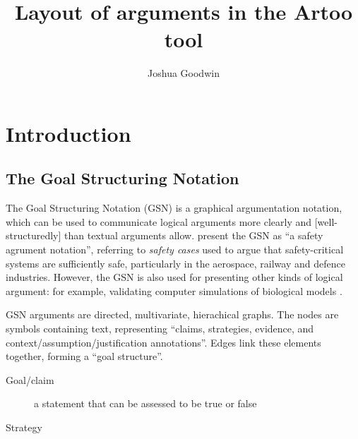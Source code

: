 \documentclass[authoryearcitations]{UoYCSproject}
\author{Joshua Goodwin}
\title{Layout of arguments in the Artoo tool}
\begin{document}
\maketitle





\chapter{Introduction}

\section{The Goal Structuring Notation}

The Goal Structuring Notation (GSN) is a graphical argumentation notation,
which can be used to communicate logical arguments more clearly and [well-structuredly] than textual arguments allow.
\citet{kelly2004goal} present the GSN as ``a safety agrument notation'',
referring to \emph{safety cases} used to argue that safety-critical systems are sufficiently safe,
particularly in the aerospace, railway and defence industries.
However, the GSN is also used for presenting other kinds of logical argument: for example, validating computer simulations of biological models \cite{insilico}.

GSN arguments are directed, multivariate, hierachical graphs.
The nodes are symbols containing text, representing ``claims, strategies, evidence, and context/assumption/justification annotations''.
Edges link these elements together, forming a ``goal structure''.

\begin{description}
    \item[Goal/claim]
    a statement that can be assessed to be true or false
    \item[Strategy]

\end{description}
\end{document}
